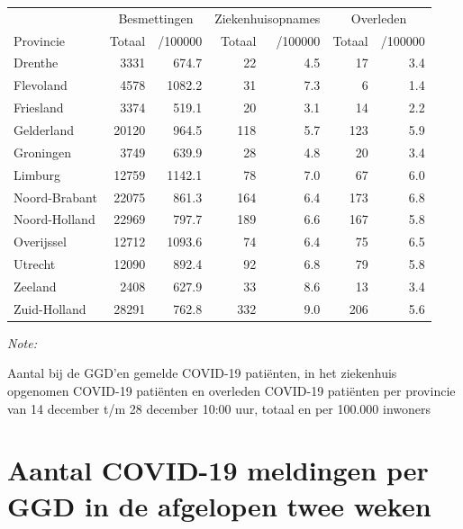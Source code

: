 \documentclass[
  english,
  man,floatsintext]{apa6}
\begin{document}
\begin{table}[H]
\centering
\begin{threeparttable}
\begin{tabular}{lrrrrrr}
\toprule
\multicolumn{1}{c}{ } & \multicolumn{2}{c}{Besmettingen} & \multicolumn{2}{c}{Ziekenhuisopnames} & \multicolumn{2}{c}{Overleden} \\
\cmidrule(l{3pt}r{3pt}){2-3} \cmidrule(l{3pt}r{3pt}){4-5} \cmidrule(l{3pt}r{3pt}){6-7}
Provincie & Totaal & /100000 & Totaal & /100000 & Totaal & /100000\\
\midrule
Drenthe & 3331 & 674.7 & 22 & 4.5 & 17 & 3.4\\
Flevoland & 4578 & 1082.2 & 31 & 7.3 & 6 & 1.4\\
Friesland & 3374 & 519.1 & 20 & 3.1 & 14 & 2.2\\
Gelderland & 20120 & 964.5 & 118 & 5.7 & 123 & 5.9\\
Groningen & 3749 & 639.9 & 28 & 4.8 & 20 & 3.4\\
Limburg & 12759 & 1142.1 & 78 & 7.0 & 67 & 6.0\\
Noord-Brabant & 22075 & 861.3 & 164 & 6.4 & 173 & 6.8\\
Noord-Holland & 22969 & 797.7 & 189 & 6.6 & 167 & 5.8\\
Overijssel & 12712 & 1093.6 & 74 & 6.4 & 75 & 6.5\\
Utrecht & 12090 & 892.4 & 92 & 6.8 & 79 & 5.8\\
Zeeland & 2408 & 627.9 & 33 & 8.6 & 13 & 3.4\\
Zuid-Holland & 28291 & 762.8 & 332 & 9.0 & 206 & 5.6\\
\bottomrule
\end{tabular}
\begin{tablenotes}
\item \textit{Note: } 
\item Aantal bij de GGD’en gemelde COVID-19 patiënten, in het ziekenhuis opgenomen COVID-19 patiënten en overleden COVID-19 patiënten per provincie van 14 december t/m 28 december 10:00 uur, totaal en per 100.000 inwoners
\end{tablenotes}
\end{threeparttable}
\end{table}

\newpage

\hypertarget{aantal-covid-19-meldingen-per-ggd-in-de-afgelopen-twee-weken}{%
\section{Aantal COVID-19 meldingen per GGD in de afgelopen twee weken}\label{aantal-covid-19-meldingen-per-ggd-in-de-afgelopen-twee-weken}}
\end{document}
